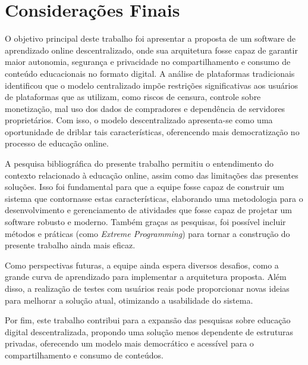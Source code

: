 \chapter[Considerações Finais]{Considerações Finais}
\label{cap:consideracoes}

O objetivo principal deste trabalho foi apresentar a proposta de um software de aprendizado online descentralizado, onde sua arquitetura fosse capaz de garantir maior autonomia, segurança e privacidade no compartilhamento e consumo de conteúdo educacionais no formato digital. A análise de plataformas tradicionais identificou que o modelo centralizado impõe restrições significativas aos usuários de plataformas que as utilizam, como riscos de censura, controle sobre monetização, mal uso dos dados de compradores e dependência de servidores proprietários. Com isso, o modelo descentralizado apresenta-se como uma oportunidade de driblar tais características, oferencendo mais democratização no processo de educação online.

A pesquisa bibliográfica do presente trabalho permitiu o entendimento do contexto relacionado à educação online, assim como das limitações das presentes soluções. Isso foi fundamental para que a equipe fosse capaz de construir um sistema que contornasse estas características, elaborando uma metodologia para o desenvolvimento e gerenciamento de atividades que fosse capaz de projetar um software robusto e moderno. Também graças as pesquisas, foi possível incluir métodos e práticas (como \textit{Extreme Programming}) para tornar a construção do presente trabalho ainda mais eficaz.

Como perspectivas futuras, a equipe ainda espera diversos desafios, como a grande curva de aprendizado para implementar a arquitetura proposta. Além disso, a realização de testes com usuários reais pode proporcionar novas ideias para melhorar a solução atual, otimizando a usabilidade do sistema.

Por fim, este trabalho contribui para a expansão das pesquisas sobre educação digital descentralizada, propondo uma solução menos dependente de estruturas privadas, oferecendo um modelo mais democrático e acessível para o compartilhamento e consumo de conteúdos.
